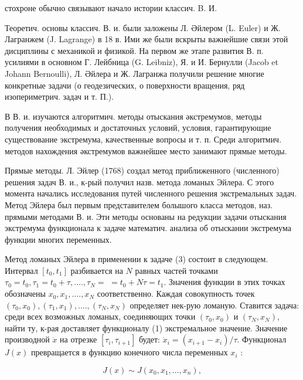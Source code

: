 \documentclass[10pt]{article}
\begin{document}
стохроне обычно связывают начало истории классич. B. И.



Теоретич. основы классич. В. и. были заложены Л. Әйлером (L. Euler) и Ж. Лагранжем (J. Lagrange) в 18 в. Ими же были вскрыты важнейшие связи этой дисциплины с механикой и физикой. На первом же этапе развития В. п. усилиями в основном Г. Лейбница (G. Leibniz), Я. и И. Бернулли (Jacob et Johann Bernoulli), Л. Әйлера и Ж. Лагранжа получили решение многие конкретные задачи (о геодезических, о поверхности вращения, ряд изопериметрич. задач и т. П.).



В В. и. изучаются алгоритмич. методы отыскания әкстремумов, методы получения необходимых и достаточных условий, условия, гарантирующие существование экстремума, качественные вопросы и т. п. Среди алгоритмич. методов нахождения әкстремумов важнейшее место занимают прямые методы.



Прямые методы. Л. Эйлер (1768) создал метод приближенного (численного) решения задач В. и., к-рый получил назв. метода ломаных Эйлера. С этого момента начались исследования путей численного решения экстремальных задач. Метод Эйлера был первым представителем болышого класса методов, наз. прямыми методами В. и. Эти методы основаны на редукции задачи отыскания экстремума функционала к задаче математич. анализа об отыскании экстремума функции многих переменных.



Метод ломаных Эйлера в применении к задаче (3) состоит в следующем. Интервал $\left[t_{0}, t_{1}\right]$ разбивается на $N$ равных частей точками $\tau_{0}=t_{0}, \tau_{1}=t_{0}+\tau, \ldots ., \tau_{N}=$ $=t_{0}+N \tau=t_{1}$. Значения функции в этих точках обозначены $x_{0}, x_{1}, \ldots ., x_{N}$ соответственно. Каждая совокупность точек $\left(\tau_{0}, x_{0}\right),\left(\tau_{1}, x_{1}\right), \ldots .,\left(\tau_{N}, x_{N}\right)$ определяет нек-рую ломаную. Ставится задача: среди всех возможных ломаных, соединяющих точки $\left(\tau_{0}, x_{0}\right)$ и $\left(\tau_{N}, x_{N}\right)$, найти ту, к-рая доставляет функционалу (1) экстремальное значение. Значение производной $\dot{x}$ на отрезке $\left[\tau_{i}, \tau_{i+1}\right]$ будет: $\dot{x}_{i}=\left(x_{i+1}-x_{i}\right) / \tau$. Функционал $J(x)$ превращается в функцию конечного числа переменных $x_{i}$ :



\[

J(x) \sim J\left(x_{0}, x_{1}, \ldots, x_{n}\right),

\]
\end{document}

